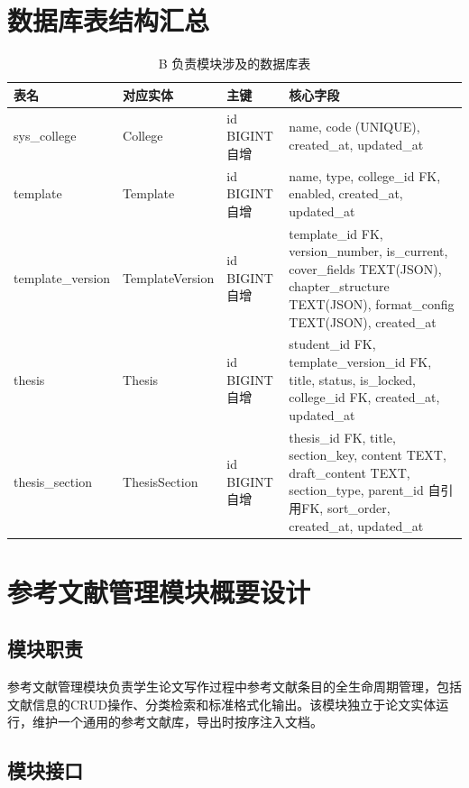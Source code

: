 \documentclass{../softeng}
\begin{document}
\section{数据库表结构汇总}

\begin{table}[htbp]
\centering
\caption{B 负责模块涉及的数据库表}
\begin{tabular}{lllp{7cm}}
\toprule
\textbf{表名} & \textbf{对应实体} & \textbf{主键} & \textbf{核心字段} \\
\midrule
sys\_college & College & id BIGINT 自增 & name, code (UNIQUE), created\_at, updated\_at \\
template & Template & id BIGINT 自增 & name, type, college\_id FK, enabled, created\_at, updated\_at \\
template\_version & TemplateVersion & id BIGINT 自增 & template\_id FK, version\_number, is\_current, cover\_fields TEXT(JSON), chapter\_structure TEXT(JSON), format\_config TEXT(JSON), created\_at \\
thesis & Thesis & id BIGINT 自增 & student\_id FK, template\_version\_id FK, title, status, is\_locked, college\_id FK, created\_at, updated\_at \\
thesis\_section & ThesisSection & id BIGINT 自增 & thesis\_id FK, title, section\_key, content TEXT, draft\_content TEXT, section\_type, parent\_id 自引用FK, sort\_order, created\_at, updated\_at \\
\bottomrule
\end{tabular}
\end{table}

\section{参考文献管理模块概要设计}

\subsection{模块职责}

参考文献管理模块负责学生论文写作过程中参考文献条目的全生命周期管理，包括文献信息的CRUD操作、分类检索和标准格式化输出。该模块独立于论文实体运行，维护一个通用的参考文献库，导出时按序注入文档。

\subsection{模块接口}
\end{document}
